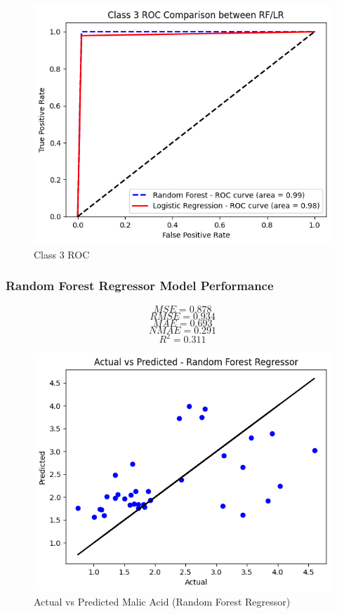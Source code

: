 \documentclass[twocolumn]{article}
\begin{document}
	\begin{figure}[H]
		\centering
		\includegraphics[width=1\linewidth]{ROC C3.png}
		\caption{Class 3 ROC}
		\label{fig:roc-c3}
	\end{figure}

	\subsubsection{Random Forest Regressor Model Performance}

	\[
		MSE = 0.878
	\]
	\[
		RMSE = 0.934
	\]
	\[
		MAE = 0.693
	\]
	\[
		NMAE = 0.291
	\]
	\[
		R^{2}= 0.311
	\]

	\begin{figure}[H]
		\centering
		\includegraphics[width=.8\linewidth]{AvP RFR.png}
		\caption{Actual vs Predicted Malic Acid (Random Forest Regressor)}
	\end{figure}
\end{document}
